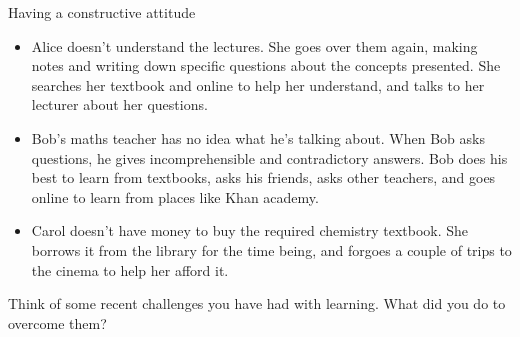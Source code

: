 		\begin{eg}{Having a constructive attitude}
			\begin{itemize}
				\item Alice doesn't understand the lectures. She goes over them again, making notes
				and writing down specific questions about the concepts presented. She searches her
				textbook and online to help her understand, and talks to her lecturer about her
				questions. 
				
				\item Bob's maths teacher has no idea what he's talking about. When Bob asks 
				questions, he gives incomprehensible and contradictory answers. Bob does his best
				to learn from textbooks, asks his friends, asks other teachers, and goes online to
				learn from places like Khan academy. 
				
				\item Carol doesn't have money to buy the required chemistry textbook. She borrows
				it from the library for the time being, and forgoes a couple of trips to the cinema
				to help her afford it. 
				
			\end{itemize}
		\end{eg}

	\begin{exercise}
	Think of some recent challenges you have had with learning. What did you do to overcome them?
	\end{exercise}	

	